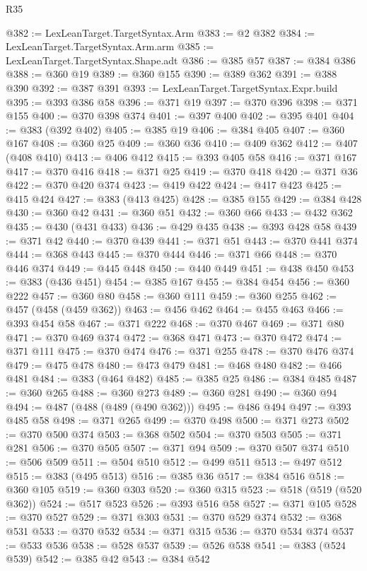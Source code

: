 \begin{lexlean}{R35}
\begin{coremodule}
@382 := LexLeanTarget.TargetSyntax.Arm
@383 := @2 @382
@384 := LexLeanTarget.TargetSyntax.Arm.arm
@385 := LexLeanTarget.TargetSyntax.Shape.adt
@386 := @385 @57
@387 := @384 @386
@388 := @360 @19
@389 := @360 @155
@390 := @389 @362
@391 := @388 @390
@392 := @387 @391
@393 := LexLeanTarget.TargetSyntax.Expr.build
@395 := @393 @386 @58
@396 := @371 @19
@397 := @370 @396
@398 := @371 @155
@400 := @370 @398 @374
@401 := @397 @400
@402 := @395 @401
@404 := @383 (@392 @402)
@405 := @385 @19
@406 := @384 @405
@407 := @360 @167
@408 := @360 @25
@409 := @360 @36
@410 := @409 @362
@412 := @407 (@408 @410)
@413 := @406 @412
@415 := @393 @405 @58
@416 := @371 @167
@417 := @370 @416
@418 := @371 @25
@419 := @370 @418
@420 := @371 @36
@422 := @370 @420 @374
@423 := @419 @422
@424 := @417 @423
@425 := @415 @424
@427 := @383 (@413 @425)
@428 := @385 @155
@429 := @384 @428
@430 := @360 @42
@431 := @360 @51
@432 := @360 @66
@433 := @432 @362
@435 := @430 (@431 @433)
@436 := @429 @435
@438 := @393 @428 @58
@439 := @371 @42
@440 := @370 @439
@441 := @371 @51
@443 := @370 @441 @374
@444 := @368 @443
@445 := @370 @444
@446 := @371 @66
@448 := @370 @446 @374
@449 := @445 @448
@450 := @440 @449
@451 := @438 @450
@453 := @383 (@436 @451)
@454 := @385 @167
@455 := @384 @454
@456 := @360 @222
@457 := @360 @80
@458 := @360 @111
@459 := @360 @255
@462 := @457 (@458 (@459 @362))
@463 := @456 @462
@464 := @455 @463
@466 := @393 @454 @58
@467 := @371 @222
@468 := @370 @467
@469 := @371 @80
@471 := @370 @469 @374
@472 := @368 @471
@473 := @370 @472
@474 := @371 @111
@475 := @370 @474
@476 := @371 @255
@478 := @370 @476 @374
@479 := @475 @478
@480 := @473 @479
@481 := @468 @480
@482 := @466 @481
@484 := @383 (@464 @482)
@485 := @385 @25
@486 := @384 @485
@487 := @360 @265
@488 := @360 @273
@489 := @360 @281
@490 := @360 @94
@494 := @487 (@488 (@489 (@490 @362)))
@495 := @486 @494
@497 := @393 @485 @58
@498 := @371 @265
@499 := @370 @498
@500 := @371 @273
@502 := @370 @500 @374
@503 := @368 @502
@504 := @370 @503
@505 := @371 @281
@506 := @370 @505
@507 := @371 @94
@509 := @370 @507 @374
@510 := @506 @509
@511 := @504 @510
@512 := @499 @511
@513 := @497 @512
@515 := @383 (@495 @513)
@516 := @385 @36
@517 := @384 @516
@518 := @360 @105
@519 := @360 @303
@520 := @360 @315
@523 := @518 (@519 (@520 @362))
@524 := @517 @523
@526 := @393 @516 @58
@527 := @371 @105
@528 := @370 @527
@529 := @371 @303
@531 := @370 @529 @374
@532 := @368 @531
@533 := @370 @532
@534 := @371 @315
@536 := @370 @534 @374
@537 := @533 @536
@538 := @528 @537
@539 := @526 @538
@541 := @383 (@524 @539)
@542 := @385 @42
@543 := @384 @542

\end{coremodule}
\end{lexlean}
